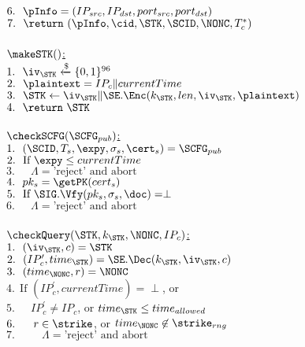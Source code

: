  $6.\ \ \pInfo = (IP_{src}, IP_{dst}, port_{src}, port_{dst})$ \\
 $7.\ \ \return\ (\pInfo, \cid, \STK, \SCID, \NONC, T_c^{\ast})$ \\
\\
\underline{$\makeSTK()$:} \\
 $1.\ \ \iv_{\STK} \xleftarrow{\$} \{0,1\}^{96}$ \\
 $2.\ \ \plaintext = IP_c \| currentTime$ \\
 $3.\ \ \STK \leftarrow \iv_{\STK} \| \SE.\Enc(k_{\STK}, len,\iv_{\STK},\plaintext)$
\\
 $4.\ \ \return\ \STK$ \\
\\
\underline{$\checkSCFG(\SCFG_{pub})$:} \\
 $1.\ \ (\SCID, T_s, \expy, \sigma_s, \cert_s) = \SCFG_{pub}$ \\
 $2.\ \ \text{If } \expy \leq currentTime$ \\
 $3.\ \ \quad \Lambda = \text{'reject' and abort}$ \\
 $4.\ \ pk_s = \getPK(cert_s)$ \\
 $5.\ \ \text{If } \SIG.\Vfy(pk_s, \sigma_s, \doc) = \perp$ \\
 $6.\ \ \quad \Lambda = \text{'reject' and abort}$ \\
\\
\underline{$\checkQuery(\STK, k_{\STK}, \NONC, IP_c)$:} \\
 $1.\ \ (\iv_{\STK}, c) = \STK$ \\
 $2.\ \ (IP_c^{\prime}, time_{\STK}) = \SE.\Dec(k_{\STK}, \iv_{\STK}, c)$ \\
 $3.\ \ (time_{\NONC}, r) = \NONC$ \\
 $4.\ \ \text{If } (IP_c^{\prime}, currentTime) = \perp$, or \\
 $5.\ \ \quad IP_c^{\prime} \neq IP_c$, or $time_{\STK} \leq time_{allowed}$\\
 $6.\ \ \quad r \in \strike$, or $time_{\NONC} \not\in \strike_{rng}$ \\
 $7.\ \ \quad \quad \Lambda = \text{'reject' and abort}$ \\
\\
